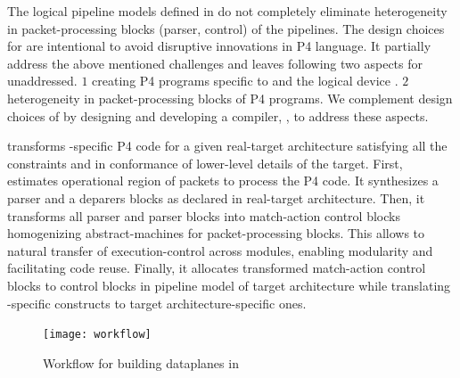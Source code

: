 \documentclass[letterpaper,twocolumn,10pt]{article}
\begin{document}
The logical pipeline models defined in \uarch do not completely
eliminate heterogeneity in packet-processing blocks (parser,
control) of the pipelines.
The design choices for \uarch are intentional to avoid disruptive
innovations in P4 language.  It partially address the above mentioned
challenges and leaves following two aspects for unaddressed.  $1$
creating P4 programs specific to \uarch and the logical device \ucomp.
$2$ heterogeneity in packet-processing blocks of P4 programs.  We
complement design choices of \uarch by designing and developing a
compiler, \ucomp, to address these aspects.


\ucomp transforms \uarch-specific P4 code for a given real-target
architecture satisfying all the constraints and in conformance of
lower-level details of the target.  First, \ucomp estimates
operational region of packets to process the P4 code.  It synthesizes
a parser and a deparers blocks as declared in real-target
architecture.  Then, it transforms all parser and parser blocks into
match-action control blocks homogenizing abstract-machines for
packet-processing blocks.  This allows to natural transfer of
execution-control across modules, enabling modularity and facilitating
code reuse.  Finally, it allocates transformed match-action control
blocks to control blocks in pipeline model of target architecture
while translating \uarch-specific constructs to target
architecture-specific ones.


\begin{figure}[tbh]
  \centering
  \texttt{[image: workflow]}
  \caption{Workflow for building dataplanes in \ulang}
  \label{fig:workflow}
\end{figure}





\end{document}
